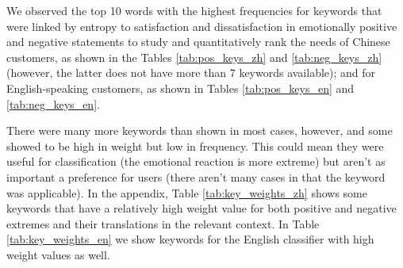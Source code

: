 We observed the top 10 words with the highest frequencies for keywords that were linked by entropy to satisfaction and dissatisfaction in emotionally positive and negative statements to study and quantitatively rank the needs of Chinese customers, as shown in the Tables \ref{tab:pos_keys_zh} and \ref{tab:neg_keys_zh} (however, the latter does not have more than 7 keywords available); and for English-speaking customers, as shown in Tables \ref{tab:pos_keys_en} and \ref{tab:neg_keys_en}.

There were many more keywords than shown in most cases, however, and some showed to be high in weight but low in frequency. This could mean they were useful for classification (the emotional reaction is more extreme) but aren't as important a preference for users (there aren't many cases in that the keyword was applicable). In the appendix, Table \ref{tab:key_weights_zh} shows some keywords that have a relatively high weight value for both positive and negative extremes and their translations in the relevant context. In Table \ref{tab:key_weights_en} we show keywords for the English classifier with high weight values as well.


